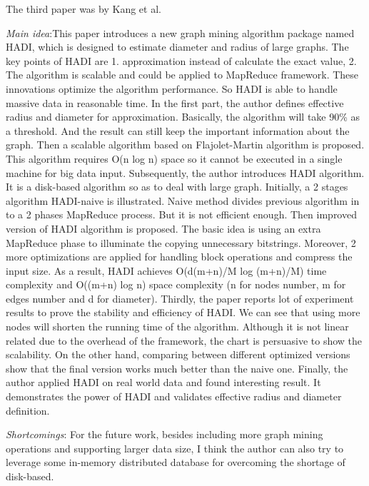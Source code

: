 The third paper was by Kang et al.
\cite{Kang:2011jg}
\begin{itemize*}
\item {\em Main idea}:This paper introduces a new graph mining algorithm package named HADI, which is designed to estimate diameter and radius of large graphs. The key points of HADI are 1. approximation instead of calculate the exact value, 2. The algorithm is scalable and could be applied to MapReduce framework. These innovations optimize the algorithm performance. So HADI is able to handle massive data in reasonable time.
In the first part, the author defines effective radius and diameter for approximation. Basically, the algorithm will take 90\% as a threshold. And the result can still keep the important information about the graph. Then a scalable algorithm based on Flajolet-Martin algorithm is proposed. This algorithm requires O(n log n) space so it cannot be executed in a single machine for big data input.
Subsequently, the author introduces HADI algorithm. It is a disk-based algorithm so as to deal with large graph. Initially, a 2 stages algorithm HADI-naive is illustrated. Naive method divides previous algorithm in to a 2 phases MapReduce process. But it is not efficient enough. Then improved version of HADI algorithm is proposed. The basic idea is using an extra MapReduce phase to illuminate the copying unnecessary bitstrings. Moreover, 2 more optimizations are applied for handling block operations and compress the input size. As a result, HADI achieves O(d(m+n)/M log (m+n)/M) time complexity and O((m+n) log n) space complexity (n for nodes number, m for edges number and d for diameter).
Thirdly, the paper reports lot of experiment results to prove the stability and efficiency of HADI. We can see that using more nodes will shorten the running time of the algorithm. Although it is not linear related due to the overhead of the framework, the chart is persuasive to show the scalability. On the other hand, comparing between different optimized versions show that the final version works much better than the naive one.
Finally, the author applied HADI on real world data and found interesting result. It demonstrates the power of HADI and validates effective radius and diameter definition.
\item {\em Shortcomings}:
	For the future work, besides including more graph mining operations and supporting larger data size, I think the author can also try to leverage some in-memory distributed database for overcoming the shortage of disk-based.
\end{itemize*}


